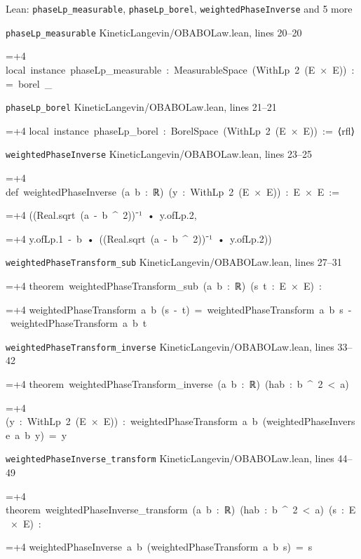 \documentclass[11pt,a4paper]{article}
\newlength{\leancharwidth}
\newenvironment{leancode}{\par\smallskip\begingroup\ttfamily\footnotesize\raggedright
  \settowidth{\leancharwidth}{M}\setlength{\parskip}{0pt}\setlength{\parindent}{0pt}
  \frenchspacing}{\par\endgroup\smallskip}
\newcommand{\leanline}[2]{\hangindent=\dimexpr#1\leancharwidth+4\leancharwidth\relax
  \hangafter=1\noindent\hspace*{#1\leancharwidth}#2\par}
\newcommand{\leansource}[1]{\par{\footnotesize\color{leanmuted}#1}\par}
\begin{document}
\begin{leanbox}{Lean: \texttt{phaseLp\_\allowbreak{}measurable}, \texttt{phaseLp\_\allowbreak{}borel}, \texttt{weightedPhaseInverse} and 5 more}
\leansource{\texttt{phaseLp\_\allowbreak{}measurable} \quad KineticLangevin/\allowbreak{}OBABOLaw.lean, lines 20–20}
\begin{leancode}
\leanline{0}{local\ instance\ phaseLp\_measurable\ :\ MeasurableSpace\ (WithLp\ 2\ (E\ ×\ E))\ :=\ borel\ \_}
\end{leancode}
\leansource{\texttt{phaseLp\_\allowbreak{}borel} \quad KineticLangevin/\allowbreak{}OBABOLaw.lean, lines 21–21}
\begin{leancode}
\leanline{0}{local\ instance\ phaseLp\_borel\ :\ BorelSpace\ (WithLp\ 2\ (E\ ×\ E))\ :=\ ⟨rfl⟩}
\end{leancode}
\leansource{\texttt{weightedPhaseInverse} \quad KineticLangevin/\allowbreak{}OBABOLaw.lean, lines 23–25}
\begin{leancode}
\leanline{0}{def\ weightedPhaseInverse\ (a\ b\ :\ ℝ)\ (y\ :\ WithLp\ 2\ (E\ ×\ E))\ :\ E\ ×\ E\ :=}
\leanline{2}{((Real.sqrt\ (a\ -\ b\ \textasciicircum{}\ 2))⁻¹\ •\ y.ofLp.2,}
\leanline{4}{y.ofLp.1\ -\ b\ •\ ((Real.sqrt\ (a\ -\ b\ \textasciicircum{}\ 2))⁻¹\ •\ y.ofLp.2))}
\end{leancode}
\leansource{\texttt{weightedPhaseTransform\_\allowbreak{}sub} \quad KineticLangevin/\allowbreak{}OBABOLaw.lean, lines 27–31}
\begin{leancode}
\leanline{0}{theorem\ weightedPhaseTransform\_sub\ (a\ b\ :\ ℝ)\ (s\ t\ :\ E\ ×\ E)\ :}
\leanline{4}{weightedPhaseTransform\ a\ b\ (s\ -\ t)\ =\ weightedPhaseTransform\ a\ b\ s\ -\ weightedPhaseTransform\ a\ b\ t}
\end{leancode}
\leansource{\texttt{weightedPhaseTransform\_\allowbreak{}inverse} \quad KineticLangevin/\allowbreak{}OBABOLaw.lean, lines 33–42}
\begin{leancode}
\leanline{0}{theorem\ weightedPhaseTransform\_inverse\ (a\ b\ :\ ℝ)\ (hab\ :\ b\ \textasciicircum{}\ 2\ <\ a)}
\leanline{4}{(y\ :\ WithLp\ 2\ (E\ ×\ E))\ :\ weightedPhaseTransform\ a\ b\ (weightedPhaseInverse\ a\ b\ y)\ =\ y}
\end{leancode}
\leansource{\texttt{weightedPhaseInverse\_\allowbreak{}transform} \quad KineticLangevin/\allowbreak{}OBABOLaw.lean, lines 44–49}
\begin{leancode}
\leanline{0}{theorem\ weightedPhaseInverse\_transform\ (a\ b\ :\ ℝ)\ (hab\ :\ b\ \textasciicircum{}\ 2\ <\ a)\ (s\ :\ E\ ×\ E)\ :}
\leanline{4}{weightedPhaseInverse\ a\ b\ (weightedPhaseTransform\ a\ b\ s)\ =\ s}

\end{leancode}
\end{leanbox}
\end{document}
